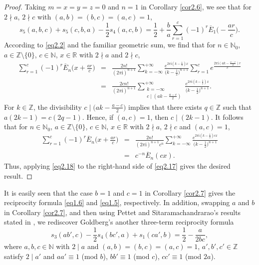 \documentclass[reqno]{amsart}
\numberwithin{equation}{section}
\begin{document}
\begin{proof}
Taking $m=x=y=z=0$ and $n=1$ in Corollary \ref{cor2.6}, we see that for $2\nmid a$, $2\nmid c$ with $(a,b)=(b,c)=(a,c)=1$,
\begin{equation}\label{eq2.17}
s_{5}(a,b,c)+s_{5}(c,b,a)-\frac{1}{2}s_{4}(a,c,b)=\frac{1}{2}+\frac{b}{a}\sum_{r=1}^{c}(-1)^{r}\overline{E}_{1}\biggl(-\frac{ar}{c}\biggl).
\end{equation}
According to \eqref{eq2.2} and the familiar geometric sum, we find that for $n\in\mathbb{N}_{0}$, $a\in\mathbb{Z}\setminus\{0\}$, $c\in\mathbb{N}$, $x\in\mathbb{R}$ with $2\nmid a$ and $2\nmid c$,
\begin{eqnarray*}
\sum_{r=1}^{c}(-1)^{r}\overline{E}_{n}\biggl(x+\frac{ar}{c}\biggl)
&=&\frac{2n!}{(2\pi\mathrm{i})^{n+1}}\sum_{k=-\infty}^{+\infty}\frac{e^{2\pi\mathrm{i}(k-\frac{1}{2})x}}{\bigl(k-\frac{1}{2}\bigl)^{n+1}}
\sum_{r=1}^{c}e^{\frac{2\pi\mathrm{i}(ak-\frac{a-c}{2})r}{c}}\nonumber\\
&=&\frac{2cn!}{(2\pi\mathrm{i})^{n+1}}\sum_{\substack{k=-\infty\\c\mid(ak-\frac{a-c}{2})}}^{+\infty}\frac{e^{2\pi\mathrm{i}(k-\frac{1}{2})x}}{\bigl(k-\frac{1}{2}\bigl)^{n+1}}.
\end{eqnarray*}
For $k\in\mathbb{Z}$, the divisibility $c\mid\bigl(ak-\frac{a-c}{2}\bigr)$ implies that there exists $q\in\mathbb{Z}$ such that $a(2k-1)=c(2q-1)$. Hence, if $(a,c)=1$, then $c\mid(2k-1)$. It follows that for $n\in\mathbb{N}_{0}$, $a\in\mathbb{Z}\setminus\{0\}$, $c\in\mathbb{N}$, $x\in\mathbb{R}$ with $2\nmid a$, $2\nmid c$ and $(a,c)=1$,
\begin{eqnarray}\label{eq2.18}
\sum_{r=1}^{c}(-1)^{r}\overline{E}_{n}\biggl(x+\frac{ar}{c}\biggl)
&=&\frac{2n!}{(2\pi\mathrm{i})^{n+1}c^{n}}\sum_{k=-\infty}^{+\infty}\frac{e^{2\pi\mathrm{i}(k-\frac{1}{2})cx}}{\bigl(k-\frac{1}{2}\bigl)^{n+1}}\nonumber\\
&=&c^{-n}\overline{E}_{n}(cx).
\end{eqnarray}
Thus, applying \eqref{eq2.18} to the right-hand side of \eqref{eq2.17} gives the desired result.
\end{proof}

It is easily seen that the case $b=1$ and $c=1$ in Corollary \ref{cor2.7} gives the reciprocity formula \eqref{eq1.6} and \eqref{eq1.5}, respectively. In addition, swapping $a$
and $b$ in Corollary \ref{cor2.7}, and then using Pettet and Sitaramachandrarao's results stated in \cite[Equations (3.7), (3.8) and (3.9)]{pettet}, we rediscover Goldberg's \cite[Theorem 5.6]{goldberg} another three-term reciprocity formula
\begin{equation}\label{eq2.19}
s_{3}(ab',c)-\frac{1}{2}s_{4}(bc',a)+s_{1}(ca',b)=\frac{1}{2}-\frac{a}{2bc},
\end{equation}
where $a,b,c\in\mathbb{N}$ with $2\mid a$ and $(a,b)=(b,c)=(a,c)=1$, $a',b',c'\in\mathbb{Z}$ satisfy $2\mid a'$ and $aa'\equiv 1$ (mod $b$), $bb'\equiv 1$ (mod $c$), $cc'\equiv 1$ (mod $2a$).
\end{document}
